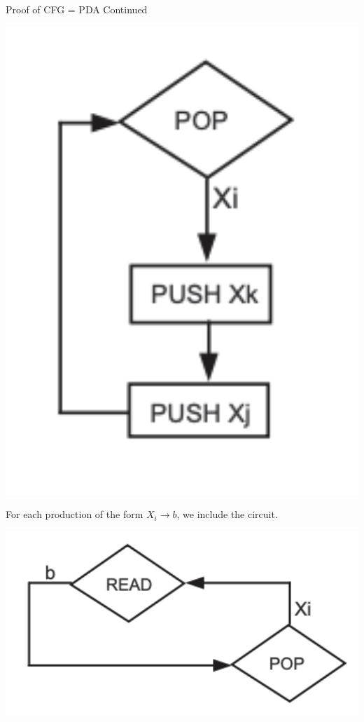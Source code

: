 \documentclass{article}
\begin{document}
\begin{multicols*}{3}
\begin{blackbox}{Proof of CFG = PDA Continued}
\begin{multicols*}{2}
\begin{minipage}{0.45\textwidth}
        \includegraphics[width=1\textwidth]{th30_2.png}
    \end{minipage}
    \begin{minipage}{0.45\textwidth}
        For each production of the form $X_i \rightarrow b$, we include the circuit.

        \includegraphics[width=1\textwidth]{th30_3.png}
        

\end{minipage}
\end{multicols*}
\end{blackbox}
\end{multicols*}
\end{document}
